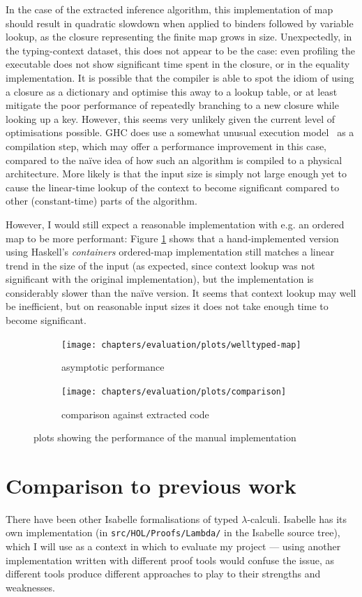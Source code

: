In the case of the extracted inference algorithm, this implementation of map should result in quadratic slowdown when applied to binders followed by variable lookup, as the closure representing the finite map grows in size.
Unexpectedly, in the typing-context dataset, this does not appear to be the case: even profiling the executable does not show significant time spent in the closure, or in the equality implementation.
It is possible that the compiler is able to spot the idiom of using a closure as a dictionary and optimise this away to a lookup table, or at least mitigate the poor performance of repeatedly branching to a new closure while looking up a key.
However, this seems very unlikely given the current level of optimisations possible.
GHC does use a somewhat unusual execution model~\cite{STG} as a compilation step, which may offer a performance improvement in this case, compared to the na\"ive idea of how such an algorithm is compiled to a physical architecture.
More likely is that the input size is simply not large enough yet to cause the linear-time lookup of the context to become significant compared to other (constant-time) parts of the algorithm.

However, I would still expect a reasonable implementation with e.g. an ordered map to be more performant: Figure \ref{fig:results-map} shows that a hand-implemented version using Haskell's \emph{containers} ordered-map implementation still matches a linear trend in the size of the input (as expected, since context lookup was not significant with the original implementation), but the implementation is considerably slower than the na\"ive version.
It seems that context lookup may well be inefficient, but on reasonable input sizes it does not take enough time to become significant.

\begin{figure}
\begin{subfigure}{.49\textwidth}
 \centering
 \texttt{[image: chapters/evaluation/plots/welltyped-map]}
 \caption{asymptotic performance}
\end{subfigure}
\begin{subfigure}{.49\textwidth}
 \centering
 \texttt{[image: chapters/evaluation/plots/comparison]}
 \caption{comparison against extracted code}
\end{subfigure}
\caption{plots showing the performance of the manual implementation}
\label{fig:results-map}
\end{figure}

\section{Comparison to previous work}
\label{sec:comparison}
There have been other Isabelle formalisations of typed \(\lambda\)-calculi.
Isabelle has its own implementation (in \texttt{src/HOL/Proofs/Lambda/} in the Isabelle source tree), which I will use as a context in which to evaluate my project --- using another implementation written with different proof tools would confuse the issue, as different tools produce different approaches to play to their strengths and weaknesses.

